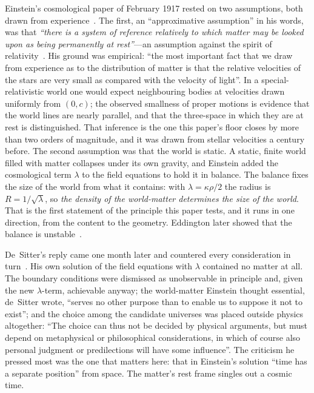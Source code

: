\documentclass[11pt,a4paper]{article}
\begin{document}
Einstein's cosmological paper of February 1917 rested on two assumptions, both drawn from experience~\cite{Einstein1917}. The first, an ``approximative assumption'' in his words, was that \emph{``there is a system of reference relatively to which matter may be looked upon as being permanently at rest''}---an assumption against the spirit of relativity~\cite{JanzenEinsteinCosmology}. His ground was empirical: ``the most important fact that we draw from experience as to the distribution of matter is that the relative velocities of the stars are very small as compared with the velocity of light''. In a special-relativistic world one would expect neighbouring bodies at velocities drawn uniformly from $(0,c)$; the observed smallness of proper motions is evidence that the world lines are nearly parallel, and that the three-space in which they are at rest is distinguished. That inference is the one this paper's floor closes by more than two orders of magnitude, and it was drawn from stellar velocities a century before. The second assumption was that the world is static. A static, finite world filled with matter collapses under its own gravity, and Einstein added the cosmological term $\lambda$ to the field equations to hold it in balance. The balance fixes the size of the world from what it contains: with $\lambda=\kappa\rho/2$ the radius is $R=1/\sqrt{\lambda}$, so \emph{the density of the world-matter determines the size of the world}. That is the first statement of the principle this paper tests, and it runs in one direction, from the content to the geometry. Eddington later showed that the balance is unstable~\cite{Eddington1930}.

De~Sitter's reply came one month later and countered every consideration in turn~\cite{deSitter1917}. His own solution of the field equations with $\lambda$ contained no matter at all. The boundary conditions were dismissed as unobservable in principle and, given the new $\lambda$-term, achievable anyway; the world-matter Einstein thought essential, de~Sitter wrote, ``serves no other purpose than to enable us to suppose it not to exist''; and the choice among the candidate universes was placed outside physics altogether: ``The choice can thus not be decided by physical arguments, but must depend on metaphysical or philosophical considerations, in which of course also personal judgment or predilections will have some influence''. The criticism he pressed most was the one that matters here: that in Einstein's solution ``time has a separate position'' from space. The matter's rest frame singles out a cosmic time.
\end{document}
